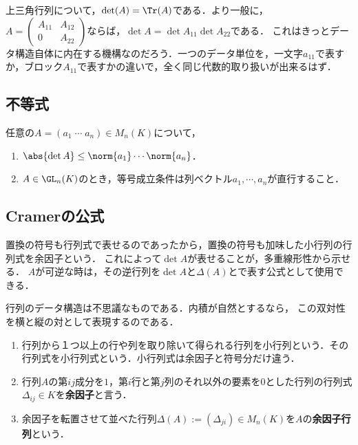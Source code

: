 \documentclass[uplatex, dvipdfmx]{jsreport}
\begin{document}
\begin{example}[上三角行列の行列式]\label{example-determinant-of-triangular-matrices}
    上三角行列について，$\det (A)=\Tr(A)$である．より一般に，
    $A=\begin{pmatrix}A_{11}&A_{12}\\0&A_{22}\end{pmatrix}$ならば，$\det A=\det A_{11}\det A_{22}$である．
    これはきっとデータ構造自体に内在する機構なのだろう．一つのデータ単位を，一文字$a_{11}$で表すか，ブロック$A_{11}$で表すかの違いで，全く同じ代数的取り扱いが出来るはず．
\end{example}

\subsection{不等式}

\begin{proposition}[Hadamardの不等式]
    任意の$A=(a_1\;\cdots\;a_n)\in M_n(K)$について，
    \begin{enumerate}
        \item $\abs{\det A}\le\norm{a_1}\cdots\norm{a_n}$．
        \item $A\in\GL_n(K)$のとき，等号成立条件は列ベクトル$a_1,\cdots,a_n$が直行すること．
    \end{enumerate}
\end{proposition}

\subsection{Cramerの公式}

\begin{tcolorbox}[colframe=ForestGreen, colback=ForestGreen!10!white, breakable]
    置換の符号も行列式で表せるのであったから，置換の符号も加味した小行列の行列式を余因子という．
    これによって$\det A$が表せることが，多重線形性から示せる．
    $A$が可逆な時は，その逆行列を$\det A$と$\Delta(A)$とで表す公式として使用できる．

    行列のデータ構造は不思議なものである．内積が自然とするなら，
    この双対性を横と縦の対として表現するのである．
\end{tcolorbox}

\begin{definition}\mbox{}
    \begin{enumerate}
        \item 行列から１つ以上の行や列を取り除いて得られる行列を小行列という．その行列式を小行列式という．小行列式は余因子と符号分だけ違う．
        \item 行列$A$の第$ij$成分を$1$，第$i$行と第$j$列のそれ以外の要素を$0$とした行列の行列式$\Delta_{ij}\in K$を\textbf{余因子}と言う．
        \item 余因子を転置させて並べた行列$\Delta(A):=(\Delta_{ji})\in M_n(K)$を$A$の\textbf{余因子行列}という．
    \end{enumerate}
\end{definition}
\end{document}
